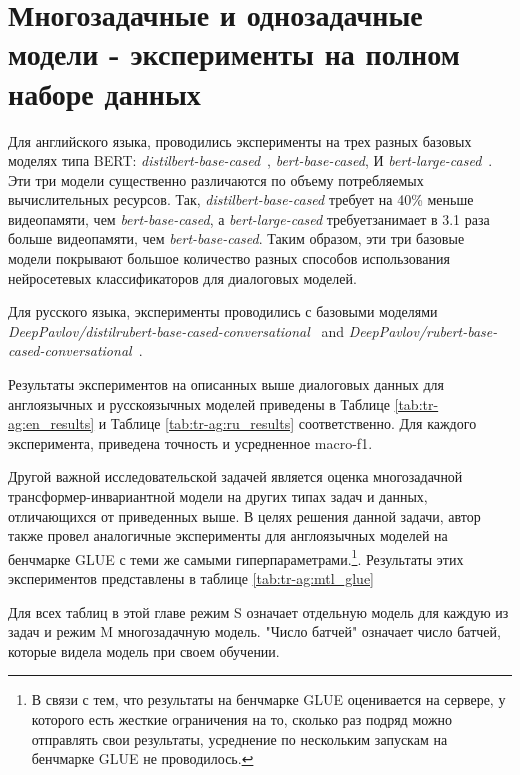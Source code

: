 \section{Многозадачные и однозадачные модели - эксперименты на полном наборе данных} 
Для английского языка, проводились эксперименты на трех разных базовых моделях типа BERT: \textit{distilbert-base-cased}~\cite{distilbert}, \textit{bert-base-cased}, И \textit{bert-large-cased}~\cite{bert}.  Эти три модели существенно различаются по объему потребляемых вычислительных ресурсов. Так, 
\textit{distilbert-base-cased} требует на 40\% меньше видеопамяти, чем \textit{bert-base-cased}, а \textit{bert-large-cased} требуетзанимает в  3.1 раза больше видеопамяти, чем \textit{bert-base-cased}. Таким образом, эти три базовые модели покрывают большое количество разных способов использования нейросетевых классификаторов для диалоговых моделей. 

Для русского языка, эксперименты проводились с базовыми моделями \textit{DeepPavlov/distilrubert-base-cased-conversational}~\cite{distilrubert} and \textit{DeepPavlov/rubert-base-cased-conversational}~\cite{rubert}.

Результаты экспериментов на описанных выше диалоговых данных для англоязычных и русскоязычных моделей приведены в Таблице \ref{tab:tr-ag:en_results} и Таблице \ref{tab:tr-ag:ru_results} соответственно. Для каждого эксперимента, приведена точность и усредненное macro-f1.

Другой важной исследовательской задачей является оценка многозадачной трансформер-инвариантной модели на других типах задач и данных, отличающихся от приведенных выше. В целях решения данной задачи, автор также провел аналогичные эксперименты для англоязычных моделей на бенчмарке GLUE\cite{wang_2018} с теми же самыми гиперпараметрами.\footnote{В связи с тем, что результаты на бенчмарке GLUE оценивается на сервере, у которого есть жесткие ограничения на то, сколько раз подряд можно отправлять свои результаты, усреднение по нескольким запускам на бенчмарке GLUE не проводилось.}. Результаты этих экспериментов представлены в таблице \ref{tab:tr-ag:mtl_glue}

Для всех таблиц в этой главе режим S означает отдельную модель для каждую из задач и режим M многозадачную модель. "Число батчей" означает число батчей, которые видела модель при своем обучении.

